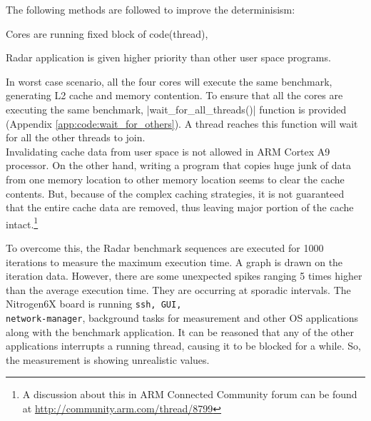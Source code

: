 \noindent
The following methods are followed to improve the determinisism:
\begin{compactitem} 
	\item Cores are running fixed block of code(thread), 
	\item Radar application is given higher priority than other user space programs. \\
\end{compactitem} 

In worst case scenario, all the four cores will execute the same benchmark, generating L2 cache and memory contention. To ensure that all the cores are executing the same benchmark, \bverb|wait_for_all_threads()| function is provided (Appendix \ref{app:code:wait_for_others}). A thread reaches this function will wait for all the other threads to join. \\

Invalidating cache data from user space is not allowed in ARM Cortex A9 processor. On the other hand, writing a program that copies huge junk of data from one memory location to other memory location seems to clear the cache contents. But, because of the complex caching strategies, it is not guaranteed that the entire cache data are removed, thus leaving major portion of the cache intact.\footnote{A discussion about this in ARM Connected Community forum can be found at \url{http://community.arm.com/thread/8799}} 

To overcome this, the Radar benchmark sequences are executed for 1000 iterations to measure the maximum execution time. A graph is drawn on the iteration data. However, there are some unexpected spikes ranging 5 times higher than the average execution time. They are occurring at sporadic intervals. The Nitrogen6X board is running \verb|ssh, GUI,| \\ \verb|network-manager|, background tasks for measurement and other OS applications along with the benchmark application. It can be reasoned that any of the other applications interrupts a running thread, causing it to be blocked for a while. So, the measurement is showing unrealistic values.

